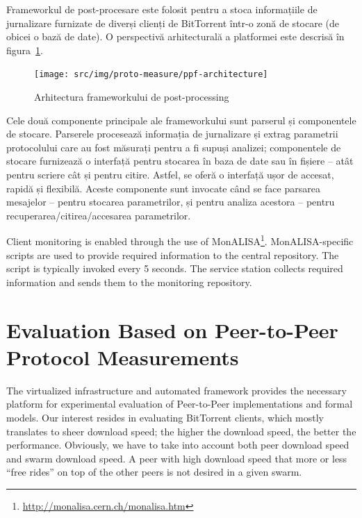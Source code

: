 Frameworkul de post-procesare este folosit pentru a stoca informațiile de
jurnalizare furnizate de diverși clienți de BitTorrent într-o zonă de stocare
(de obicei o bază de date). O perspectivă arhitecturală a platformei este
descrisă în figura~\ref{fig:proto-measure:ppf-architecture}.

\begin{figure}[h]
  \begin{center}
    \texttt{[image: src/img/proto-measure/ppf-architecture]}
  \end{center}
  \caption{Arhitectura frameworkului de post-processing}
  \label{fig:proto-measure:ppf-architecture}
\end{figure}

Cele două componente principale ale frameworkului sunt parserul și componentele
de stocare. Parserele procesează informația de jurnalizare și extrag parametrii
protocolului care au fost măsurați pentru a fi supuși analizei; componentele
de stocare furnizează o interfață pentru stocarea în baza de date sau în fișiere
-- atât pentru scriere cât și pentru citire. Astfel, se oferă o interfață
ușor de accesat, rapidă și flexibilă. Aceste componente sunt invocate când
se face parsarea mesajelor -- pentru stocarea parametrilor, și pentru
analiza acestora -- pentru recuperarea/citirea/accesarea parametrilor.

Client monitoring is enabled through the use of
MonALISA\footnote{\url{http://monalisa.cern.ch/monalisa.htm}}. MonALISA-specific
scripts are used to provide required information to the central repository.
The script is typically invoked every 5 seconds. The service station collects
required information and sends them to the monitoring repository.

\section{Evaluation Based on Peer-to-Peer Protocol Measurements}
\label{sec:proto-measure:eval-swarm}

The virtualized infrastructure and automated framework provides the necessary
platform for experimental evaluation of Peer-to-Peer implementations and
formal models. Our interest resides in evaluating BitTorrent clients, which
mostly translates to sheer download speed; the higher the download speed, the
better the performance. Obviously, we have to take into account both peer
download speed and swarm download speed. A peer with high download speed that
more or less ``free rides'' on top of the other peers is not desired in a
given swarm.

